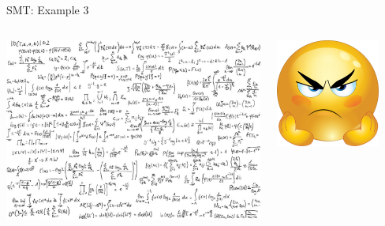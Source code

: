 \documentclass[10pt, compress, aspectratio=169]{beamer}
\begin{document}
\begin{frame}{SMT: Example 3}

	\begin{columns}
		\begin{column}{0.7\textwidth}
			\includegraphics[width=\textwidth]{images/equations2.eps}
		\end{column}
		\begin{column}{0.3\textwidth}
			\includegraphics[width=0.8\textwidth]{images/angry.png}
		\end{column}
	\end{columns}  
	
\end{frame}
\end{document}
